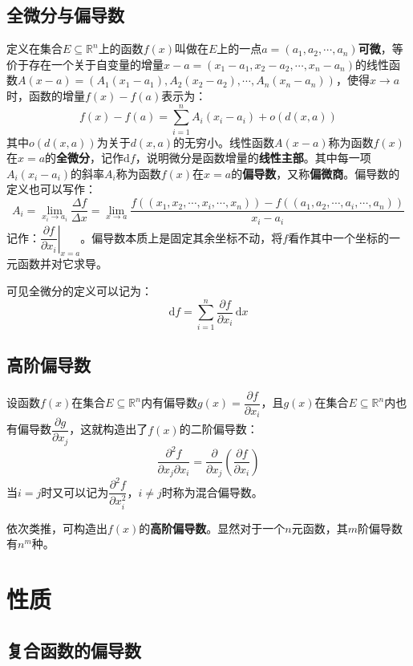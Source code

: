 \documentclass[fontset=none,openany,a4paper]{ctexbook}
\begin{document}
\subsection{全微分与偏导数}

定义在集合$E\subseteq\mathbb{R}^n$上的函数$f(x)$叫做在$E$上的一点$a=(a_1,a_2,\cdots,a_n)$\textbf{可微}，等价于存在一个关于自变量的增量$x-a=(x_1-a_1,x_2-a_2,\cdots,x_n-a_n)$的线性函数$A(x-a)=(A_1(x_1-a_1),A_2(x_2-a_2),\cdots,A_n(x_n-a_n))$，使得$x\to a$时，函数的增量$f(x)-f(a)$表示为：
\[
f(x) - f(a) = \sum_{i=1}^n A_i(x_i-a_i) + o(d(x,a))
\]
其中$o(d(x,a))$为关于$d(x,a)$的无穷小。线性函数$A(x-a)$称为函数$f(x)$在$x=a$的\textbf{全微分}，记作$\mathrm{d}f$，说明微分是函数增量的\textbf{线性主部}。其中每一项$A_i(x_i-a_i)$的斜率$A_i$称为函数$f(x)$在$x=a$的\textbf{偏导数}，又称\textbf{偏微商}。偏导数的定义也可以写作：
\[
A_i = \lim_{x_i\to a_i}\frac{\Delta f}{\Delta x} = \lim_{x\to a}\frac{f((x_1,x_2,\cdots,x_i,\cdots,x_n))-f((a_1,a_2,\cdots,a_i,\cdots,a_n))}{x_i-a_i}
\]
记作：$\left.\dfrac{\partial f}{\partial x_i}\right|_{x=a}$。偏导数本质上是固定其余坐标不动，将$f$看作其中一个坐标的一元函数并对它求导。

可见全微分的定义可以记为：
\[
\mathrm{d}f = \sum_{i=1}^n \frac{\partial f}{\partial x_i}\,\mathrm{d}x
\]

\subsection{高阶偏导数}

设函数$f(x)$在集合$E\subseteq\mathbb{R}^n$内有偏导数$g(x)=\dfrac{\partial f}{\partial x_i}$，且$g(x)$在集合$E\subseteq\mathbb{R}^n$内也有偏导数$\dfrac{\partial g}{\partial x_j}$，这就构造出了$f(x)$的二阶偏导数：
\[
\frac{\partial^2 f}{\partial x_j\partial x_i} = \frac{\partial}{\partial x_j}\left(\frac{\partial f}{\partial x_i}\right)
\]
当$i=j$时又可以记为$\dfrac{\partial^2 f}{\partial x_i^2}$，$i\neq j$时称为混合偏导数。

依次类推，可构造出$f(x)$的\textbf{高阶偏导数}。显然对于一个$n$元函数，其$m$阶偏导数有$n^m$种。

\section{性质}

\subsection{复合函数的偏导数}
\end{document}
